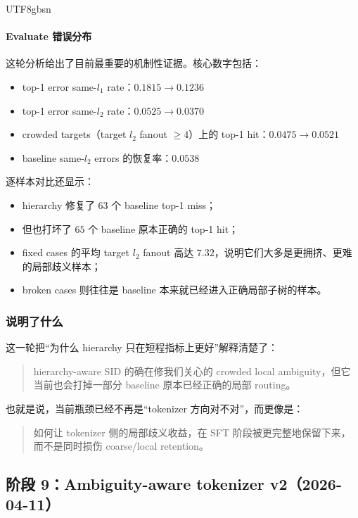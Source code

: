 \documentclass[11pt]{article}
\begin{document}
\begin{CJK*}{UTF8}{gbsn}
\paragraph{Evaluate 错误分布}

这轮分析给出了目前最重要的机制性证据。核心数字包括：

\begin{itemize}
  \item top-1 error same-\(l_1\) rate：\(0.1815 \rightarrow 0.1236\)
  \item top-1 error same-\(l_2\) rate：\(0.0525 \rightarrow 0.0370\)
  \item crowded targets（target \(l_2\) fanout \(\ge 4\)）上的 top-1 hit：\(0.0475 \rightarrow 0.0521\)
  \item baseline same-\(l_2\) errors 的恢复率：\(0.0538\)
\end{itemize}

逐样本对比还显示：

\begin{itemize}
  \item hierarchy 修复了 \(63\) 个 baseline top-1 miss；
  \item 但也打坏了 \(65\) 个 baseline 原本正确的 top-1 hit；
  \item fixed cases 的平均 target \(l_2\) fanout 高达 \(7.32\)，说明它们大多是更拥挤、更难的局部歧义样本；
  \item broken cases 则往往是 baseline 本来就已经进入正确局部子树的样本。
\end{itemize}

\subsubsection*{说明了什么}

这一轮把“为什么 hierarchy 只在短程指标上更好”解释清楚了：

\begin{quote}
hierarchy-aware SID 的确在修我们关心的 crowded local ambiguity，但它当前也会打掉一部分 baseline 原本已经正确的局部 routing。
\end{quote}

也就是说，当前瓶颈已经不再是“tokenizer 方向对不对”，而更像是：

\begin{quote}
如何让 tokenizer 侧的局部歧义收益，在 SFT 阶段被更完整地保留下来，而不是同时损伤 coarse/local retention。
\end{quote}

\subsection{阶段 9：Ambiguity-aware tokenizer v2（2026-04-11）}


\end{CJK*}
\end{document}
